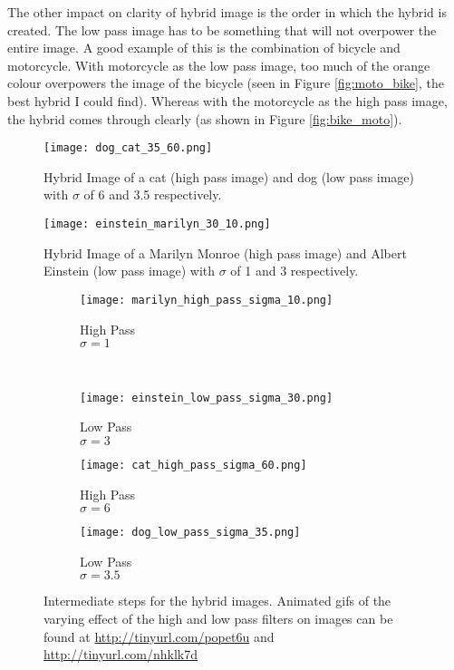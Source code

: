 \documentclass[a4paper,10pt]{article}
\begin{document}
The other impact on clarity of hybrid image is the order in which the hybrid is
created. The low pass image has to be something that will not overpower the
entire image. A good example of this is the combination of bicycle and motorcycle.
With motorcycle as the low pass image, too much of the orange colour overpowers
the image of the bicycle (seen in Figure \ref{fig:moto_bike}, the best hybrid I
could find). Whereas with the motorcycle as the high pass image, the hybrid
comes through clearly (as shown in Figure \ref{fig:bike_moto}).

\begin{figure}[ht!]
    \centering
    \texttt{[image: dog\_cat\_35\_60.png]}
    \caption{Hybrid Image of a cat (high pass image) and dog (low pass image)
             with $\sigma$ of 6 and 3.5 respectively. \label{fig:dog_cat}}
\end{figure}

\begin{figure}[ht!]
    \centering
    \texttt{[image: einstein\_marilyn\_30\_10.png]}
    \caption{Hybrid Image of a Marilyn Monroe (high pass image) and Albert
             Einstein (low pass image) with $\sigma$ of 1 and 3 respectively.
             \label{fig:einstein_marilyn}}
\end{figure}

\begin{figure}[ht!]
    \centering
    \begin{subfigure}[b]{0.2\textwidth}
        \texttt{[image: marilyn\_high\_pass\_sigma\_10.png]}
        \caption{High Pass \\ $\sigma = 1$\label{fig:high_marilyn}}
    \end{subfigure}
    ~%
    \begin{subfigure}[b]{0.2\textwidth}
        \texttt{[image: einstein\_low\_pass\_sigma\_30.png]}
        \caption{Low Pass \\$\sigma = 3$\label{fig:low_einstein}}
    \end{subfigure}
    \begin{subfigure}[b]{0.2\textwidth}
        \texttt{[image: cat\_high\_pass\_sigma\_60.png]}
        \caption{High Pass \\ $\sigma = 6$\label{fig:high_cat}}
    \end{subfigure}
    \begin{subfigure}[b]{0.2\textwidth}
        \texttt{[image: dog\_low\_pass\_sigma\_35.png]}
        \caption{Low Pass \\$\sigma = 3.5$\label{fig:low_dog}}
    \end{subfigure}
\caption{Intermediate steps for the hybrid images. Animated gifs of the
         varying effect of the high and low pass filters on images can be found
         at \url{http://tinyurl.com/popet6u} and
         \url{http://tinyurl.com/nhklk7d} \label{fig:intermediate}}
\end{figure}
\end{document}
